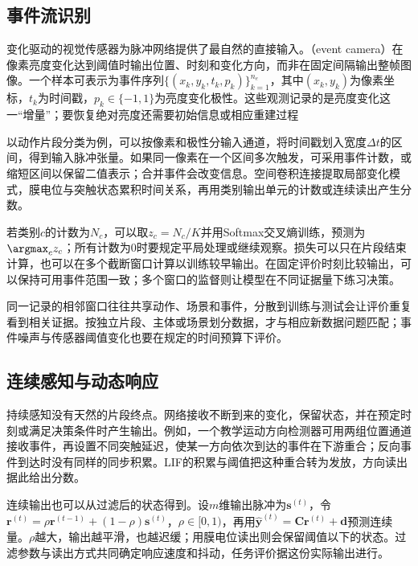 \subsection{事件流识别}
\label{sec:snn-event-recognition}

变化驱动的视觉传感器为脉冲网络提供了最自然的直接输入。（event camera）在像素亮度变化达到阈值时输出位置、时刻和变化方向，而非在固定间隔输出整帧图像。一个样本可表示为事件序列$\{(x_k,y_k,t_k,p_k)\}_{k=1}^{n_e}$，其中$(x_k,y_k)$为像素坐标，$t_k$为时间戳，$p_k\in\{-1,1\}$为亮度变化极性。这些观测记录的是亮度变化这一“增量”；要恢复绝对亮度还需要初始信息或相应重建过程

以动作片段分类为例，可以按像素和极性分输入通道，将时间戳划入宽度$\Delta t$的区间，得到输入脉冲张量。如果同一像素在一个区间多次触发，可采用事件计数，或缩短区间以保留二值表示；合并事件会改变信息。空间卷积连接提取局部变化模式，膜电位与突触状态累积时间关系，再用类别输出单元的计数或连续读出产生分数。

若类别$c$的计数为$N_c$，可以取$z_c=N_c/K$并用Softmax交叉熵训练，预测为$\argmax_c z_c$；所有计数为0时要规定平局处理或继续观察。损失可以只在片段结束计算，也可以在多个截断窗口计算以训练较早输出。在固定评价时刻比较输出，可以保持可用事件范围一致；多个窗口的监督则让模型在不同证据量下练习决策。

同一记录的相邻窗口往往共享动作、场景和事件，分散到训练与测试会让评价重复看到相关证据。按独立片段、主体或场景划分数据，才与相应新数据问题匹配；事件噪声与传感器阈值变化也要在规定的时间预算下评价。

\subsection{连续感知与动态响应}
\label{sec:snn-continuous-response}

持续感知没有天然的片段终点。网络接收不断到来的变化，保留状态，并在预定时刻或满足决策条件时产生输出。例如，一个教学运动方向检测器可用两组位置通道接收事件，再设置不同突触延迟，使某一方向依次到达的事件在下游重合；反向事件到达时没有同样的同步积累。LIF的积累与阈值把这种重合转为发放，方向读出据此给出分数。

连续输出也可以从过滤后的状态得到。设$m$维输出脉冲为$\bm s^{(t)}$，令$\bm r^{(t)}=\rho\bm r^{(t-1)}+(1-\rho)\bm s^{(t)}$，$\rho\in[0,1)$，再用$\hat{\bm y}^{(t)}=\bm C\bm r^{(t)}+\bm d$预测连续量。$\rho$越大，输出越平滑，也越迟缓；用膜电位读出则会保留阈值以下的状态。过滤参数与读出方式共同确定响应速度和抖动，任务评价据这份实际输出进行。

